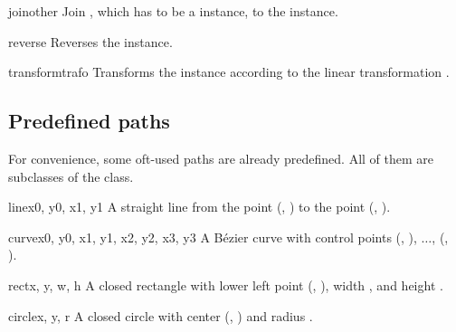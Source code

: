 \begin{methoddesc}{join}{other}
  Join , which has to be a  instance, to
  the  instance.
\end{methoddesc}

\begin{methoddesc}{reverse}{}
  Reverses the  instance.
\end{methoddesc}

\begin{methoddesc}{transform}{trafo}
  Transforms the  instance according to the linear
  transformation .
\end{methoddesc}

\subsection{Predefined paths}

\label{path:predefined}

For convenience, some oft-used paths are already predefined. All
of them are subclasses of the  class.

\begin{classdesc}{line}{x0, y0, x1, y1}
A straight line from the point (, ) to the point (, ).
\end{classdesc}

\begin{classdesc}{curve}{x0, y0, x1, y1, x2, y2, x3, y3}
A B\'ezier curve with 
control points  (, ), $\dots$, (, ).\
\end{classdesc}

\begin{classdesc}{rect}{x, y, w, h}
A closed rectangle with lower left point (, ), width , and
  height \var{h}.
\end{classdesc}

\begin{classdesc}{circle}{x, y, r}
A closed circle with center (, ) and radius .
\end{classdesc}

